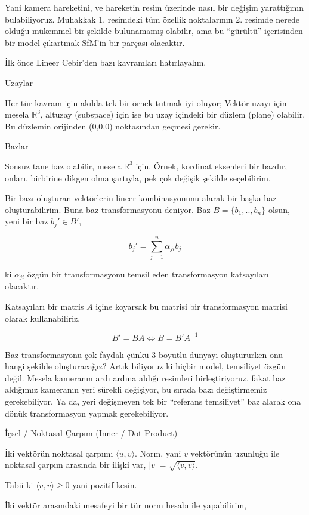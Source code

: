 \documentclass[12pt,fleqn]{article}\usepackage{../../common}
\begin{document}
Yani kamera hareketini, ve hareketin resim üzerinde nasıl bir değişim
yarattığının bulabiliyoruz. Muhakkak 1. resimdeki tüm özellik noktalarının
2. resimde nerede olduğu mükemmel bir şekilde bulunamamış olabilir, ama bu
``gürültü'' içerisinden bir model çıkartmak SfM'in bir parçası olacaktır.

İlk önce Lineer Cebir'den bazı kavramları hatırlayalım. 

Uzaylar

Her tür kavram için akılda tek bir örnek tutmak iyi oluyor; Vektör uzayı
için mesela $\mathbb{R}^3$, altuzay (subspace) için ise bu uzay içindeki
bir düzlem (plane) olabilir. Bu düzlemin orijinden (0,0,0) noktasından
geçmesi gerekir.

Bazlar

Sonsuz tane baz olabilir, mesela $\mathbb{R}^3$ için. Örnek, kordinat
eksenleri bir bazdır, onları, birbirine dikgen olma şartıyla, pek çok
değişik şekilde seçebilirim. 

Bir bazı oluşturan vektörlerin lineer kombinasyonunu alarak bir başka baz
oluşturabilirim. Buna baz transformasyonu deniyor. Baz $B = \{
b_1,..,b_n\}$ olsun, yeni bir baz $b_j' \in B'$,

$$ b_j' = \sum_{j=1}^{n} \alpha_{ji}b_j $$

ki $\alpha_{ji}$ özgün bir transformasyonu temsil eden transformasyon
katsayıları olacaktır. 

Katsayıları bir matris $A$ içine koyarsak bu matrisi bir transformasyon
matrisi olarak kullanabiliriz,

$$ B' = BA \iff B = B'A^{-1} $$

Baz transformasyonu çok faydalı çünkü 3 boyutlu dünyayı oluştururken onu
hangi şekilde oluşturacağız? Artık biliyoruz ki hiçbir model, temsiliyet
özgün değil. Mesela kameranın ardı ardına aldığı resimleri birleştiriyoruz,
fakat baz aldığımız kameranın yeri sürekli değişiyor, bu sırada bazı
değiştirmemiz gerekebiliyor. Ya da, yeri değişmeyen tek bir ``referans
temsiliyet'' baz alarak ona dönük transformasyon yapmak gerekebiliyor. 

İçsel / Noktasal Çarpım (Inner / Dot Product)

İki vektörün noktasal çarpımı $\langle u,v \rangle$. Norm, yani $v$
vektörünün uzunluğu ile noktasal çarpım arasında bir ilişki var, 
$|v| = \sqrt{\langle v,v \rangle}$.

Tabii ki $\langle v,v \rangle \ge 0$ yani pozitif kesin. 

İki vektör arasındaki mesafeyi bir tür norm hesabı ile yapabilirim, 
\end{document}
